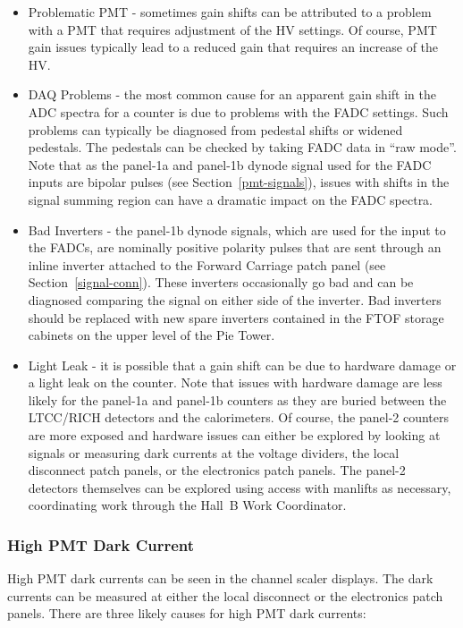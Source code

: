 \documentclass[letterpaper,10pt]{article}
\begin{document}
\begin{itemize}
\item Problematic PMT - sometimes gain shifts can be attributed to a problem with a PMT that requires 
adjustment of the HV settings. Of course, PMT gain issues typically lead to a reduced gain that requires 
an increase of the HV. 
\item DAQ Problems - the most common cause for an apparent gain shift in the ADC spectra for a counter is 
due to problems with the FADC settings. Such problems can typically be diagnosed from pedestal shifts or 
widened pedestals. The pedestals can be checked by taking FADC data in ``raw mode''. Note that as the
panel-1a and panel-1b dynode signal used for the FADC inputs are bipolar pulses (see Section~\ref{pmt-signals}), 
issues with shifts in the signal summing region can have a dramatic impact on the FADC spectra. 
\item Bad Inverters - the panel-1b dynode signals, which are used for the input to the FADCs, are nominally
positive polarity pulses that are sent through an inline inverter attached to the Forward Carriage patch
panel (see Section~\ref{signal-conn}). These inverters occasionally go bad and can be diagnosed comparing 
the signal on either side of the inverter. Bad inverters should be replaced with new spare inverters 
contained in the FTOF storage cabinets on the upper level of the Pie Tower.
\item Light Leak - it is possible that a gain shift can be due to hardware damage or a light leak on the 
counter. Note that issues with hardware damage are less likely for the panel-1a and panel-1b counters as 
they are buried between the LTCC/RICH detectors and the calorimeters. Of course, the panel-2 counters are 
more exposed and hardware issues can either be explored by looking at signals or measuring dark currents 
at the voltage dividers, the local disconnect patch panels, or the electronics patch panels. The panel-2 
detectors themselves can be explored using access with manlifts as necessary, coordinating work through 
the Hall~B Work Coordinator.
\end{itemize}

\subsubsection{High PMT Dark Current}
\label{high-current}

High PMT dark currents can be seen in the channel scaler displays. The dark currents can be measured
at either the local disconnect or the electronics patch panels. There are three likely causes for high 
PMT dark currents:
\end{document}
